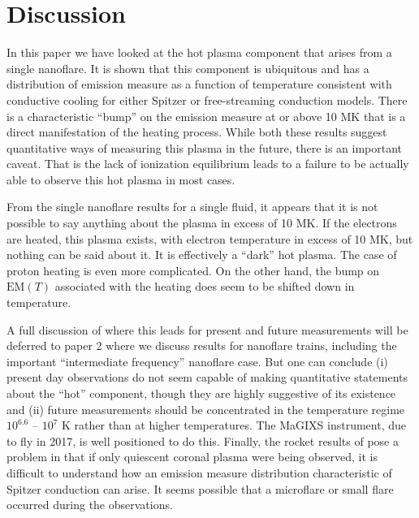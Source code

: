 \documentclass[apj]{emulateapj}
\begin{document}
	\section{Discussion}
	\label{sec:discussion}
	\par In this paper we have looked at the hot plasma component that arises from a single nanoflare. It is shown that this component is ubiquitous and has a distribution of emission measure as a function of temperature consistent with conductive cooling for either Spitzer or free-streaming conduction models. There is a characteristic ``bump'' on the emission measure at or above 10 MK that is a direct manifestation of the heating process. While both these results suggest quantitative ways of measuring this plasma in the future, there is an important caveat. That is the lack of ionization equilibrium leads to a failure to be actually able to observe this hot plasma in most cases.
	\par From the single nanoflare results for a single fluid, it appears that it is not possible to say anything about the plasma in excess of 10 MK. If the electrons are heated, this plasma exists, with electron temperature in excess of 10 MK, but nothing can be said about it. It is effectively a ``dark'' hot plasma. The case of proton heating is even more complicated. On the other hand, the bump on $\mathrm{EM}(T)$ associated with the heating does seem to be shifted down in temperature.
	\par A full discussion of where this leads for present and future measurements will be deferred to paper 2 where we discuss results for nanoflare trains, including the important ``intermediate frequency'' nanoflare case. But one can conclude (i) present day observations do not seem capable of making quantitative statements about the ``hot'' component, though they are highly suggestive of its existence and (ii) future measurements should be concentrated in the temperature regime $10^{6.6}$ – $10^7$ K rather than at higher temperatures. The MaGIXS instrument, due to fly in 2017, is well positioned to do this. Finally, the rocket results of \citet{caspi_new_2015} pose a problem in that if only quiescent coronal plasma were being observed, it is difficult to understand how an emission measure distribution characteristic of Spitzer conduction can arise. It seems possible that a microflare or small flare occurred during the observations.
	\appendix
\end{document}
